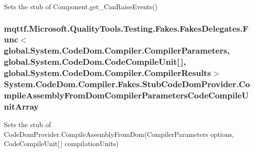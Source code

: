 Sets the stub of Component.\-get\-\_\-\-Can\-Raise\-Events()

\hypertarget{class_system_1_1_code_dom_1_1_compiler_1_1_fakes_1_1_stub_code_dom_provider_ab5911b83993cc7a5ce35965404a8ae3a}{
\subsubsection[{Compile\-Assembly\-From\-Dom\-Compiler\-Parameters\-Code\-Compile\-Unit\-Array}]{\setlength{\rightskip}{0pt plus 5cm}mqttf.\-Microsoft.\-Quality\-Tools.\-Testing.\-Fakes.\-Fakes\-Delegates.\-Func$<$global.\-System.\-Code\-Dom.\-Compiler.\-Compiler\-Parameters, global.\-System.\-Code\-Dom.\-Code\-Compile\-Unit\mbox{[}$\,$\mbox{]}, global.\-System.\-Code\-Dom.\-Compiler.\-Compiler\-Results$>$ System.\-Code\-Dom.\-Compiler.\-Fakes.\-Stub\-Code\-Dom\-Provider.\-Compile\-Assembly\-From\-Dom\-Compiler\-Parameters\-Code\-Compile\-Unit\-Array}}\label{class_system_1_1_code_dom_1_1_compiler_1_1_fakes_1_1_stub_code_dom_provider_ab5911b83993cc7a5ce35965404a8ae3a}


Sets the stub of Code\-Dom\-Provider.\-Compile\-Assembly\-From\-Dom(\-Compiler\-Parameters options, Code\-Compile\-Unit\mbox{[}$\,$\mbox{]} compilation\-Units)

